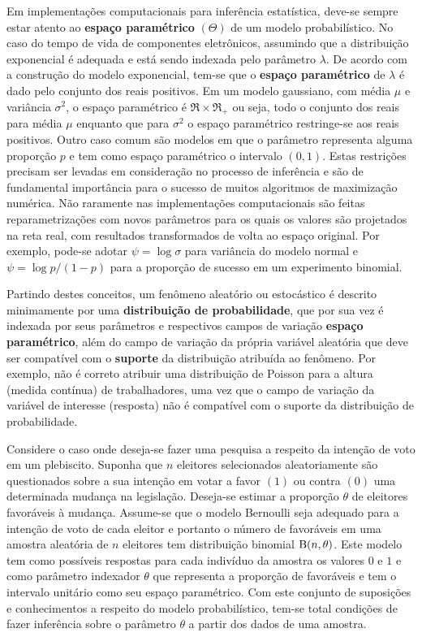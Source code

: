 \documentclass[
  9pt,
  a5paper,
]{book}
\theoremstyle{definition}
\theoremstyle{definition}
\theoremstyle{definition}
\theoremstyle{definition}
\theoremstyle{remark}
\begin{document}
Em implementações computacionais para inferência estatística, deve-se sempre estar atento ao \textbf{espaço paramétrico} \((\Theta)\) de um modelo probabilístico. No caso do tempo de vida de componentes eletrônicos, assumindo que a distribuição exponencial é adequada e está sendo indexada pelo parâmetro \(\lambda\). De acordo com a construção do modelo exponencial, tem-se que o \textbf{espaço paramétrico} de \(\lambda\) é dado pelo conjunto dos reais positivos. Em um modelo gaussiano, com média \(\mu\) e variância \(\sigma^2\), o espaço paramétrico é \(\Re \times \Re_{+}\) ou seja, todo o conjunto dos reais para média \(\mu\) enquanto que para \(\sigma^2\) o espaço paramétrico restringe-se aos reais positivos. Outro caso comum são modelos em que o parâmetro representa alguma proporção \(p\) e tem como espaço paramétrico o intervalo \((0,1)\).
Estas restrições precisam ser levadas em consideração no processo de inferência e são de fundamental importância para o sucesso de muitos algoritmos de maximização numérica.
Não raramente nas implementações computacionais são feitas reparametrizações
com novos parâmetros para os quais os valores são projetados na reta real, com resultados transformados de volta ao espaço original. Por exemplo, pode-se adotar \(\psi = \log{\sigma}\) para variância do modelo normal e \(\psi = \log{p/(1-p)}\) para a proporção de sucesso em um experimento binomial.

Partindo destes conceitos, um fenômeno aleatório ou estocástico é descrito minimamente por uma \textbf{distribuição de probabilidade}, que por sua vez é indexada por seus parâmetros e respectivos campos de variação \textbf{espaço paramétrico}, além do campo de variação da própria variável aleatória que deve ser compatível com o \textbf{suporte} da distribuição atribuída ao fenômeno. Por exemplo, não é correto atribuir uma distribuição de Poisson para a altura (medida contínua) de trabalhadores, uma vez que o campo de variação da variável de interesse (resposta) não é compatível com o suporte da distribuição de probabilidade.

Considere o caso onde deseja-se fazer uma pesquisa a respeito da intenção de voto em um plebiscito. Suponha que \(n\) eleitores selecionados aleatoriamente são questionados sobre a sua intenção em votar a favor \((1)\) ou contra \((0)\) uma determinada mudança na legislação. Deseja-se estimar a proporção \(\theta\) de eleitores favoráveis à mudança. Assume-se que o modelo Bernoulli seja adequado para a intenção de voto de cada eleitor e portanto o número de
favoráveis em uma amostra aleatória de \(n\) eleitores tem distribuição binomial \({\rm B}(n, \theta)\). Este modelo tem como possíveis respostas para cada indivíduo da amostra os valores \(0\) e \(1\) e como parâmetro indexador \(\theta\) que representa a proporção de favoráveis e tem o intervalo unitário como seu espaço paramétrico.
Com este conjunto de suposições e conhecimentos a respeito do modelo probabilístico, tem-se total condições de fazer inferência sobre o parâmetro \(\theta\) a partir dos dados de uma amostra.
\end{document}
